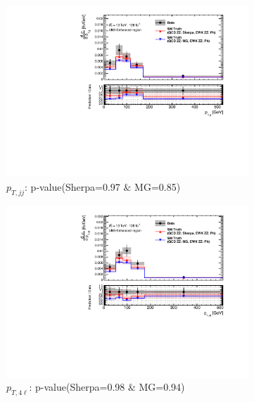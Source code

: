 \begin{figure}[!htb]
\begin{subfigure}{.48\textwidth}
        \centering
        \includegraphics[width=.98\linewidth]{figures/Results/CrossSection_VBSEnhanced/xs_ptjj_SR.pdf}
        \caption{ \footnotesize{$p_{T,jj}$: p-value(Sherpa=0.97 $\&$ MG=0.85)}}
    \end{subfigure}
    \begin{subfigure}{.48\textwidth}
        \centering
        \includegraphics[width=.98\linewidth]{figures/Results/CrossSection_VBSEnhanced/xs_pt4l_SR.pdf}
        \caption{ \footnotesize{$p_{T,4\ell}$: p-value(Sherpa=0.98 $\&$ MG=0.94)}}
    \end{subfigure}\\
    \begin{subfigure}{.48\textwidth}
        \centering

\end{subfigure}
\end{figure}
